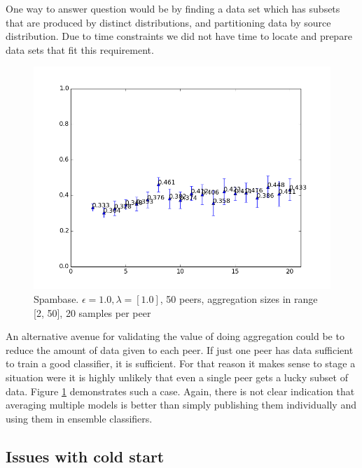 One way to answer question would be by finding a data set which has subsets that are produced by distinct distributions, and partitioning data by source distribution. Due to time constraints we did not have time to locate and prepare data sets that fit this requirement. 

\begin{figure}[h!]
	\centering
	\includegraphics[width=\textwidth]{fig/spambase/ShowingPotentialUsefulnessOfLargerGroups-eps1.0,budg=eps,peers50,groups2-20,reg2e-2-dataMax20-pubAll-LRbyCV-retuning}
	\caption{Spambase. $\epsilon = 1.0, \lambda = [1.0]$, 50 peers, aggregation sizes in range [2, 50], 20 samples per peer}
	\label{fig:groupsize_limiteddata}
\end{figure}


An alternative avenue for validating the value of doing aggregation could be to reduce the amount of data given to each peer. If just one peer has data sufficient to train a good classifier, it is sufficient. For that reason it makes sense to stage a situation were it is highly unlikely that even a single peer gets a lucky subset of data. Figure \ref{fig:groupsize_limiteddata} demonstrates such a case. Again, there is not clear indication that averaging multiple models is better than simply publishing them individually and using them in ensemble classifiers.


\subsection{Issues with cold start}


